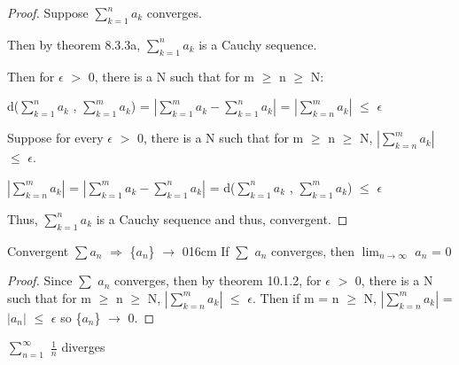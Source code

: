     \begin{proof}
        Suppose $\sum_{k=1}^n a_k$ converges.

        Then by {\color{red} theorem 8.3.3a}, $\sum_{k=1}^n a_k$ is 
        a Cauchy sequence.

        Then for $\epsilon$ $>$ 0, there is a N such that for
        m $\geq$ n $\geq$ N:

        \hspace{1cm}
        d($\sum_{k=1}^n a_k$ , $\sum_{k=1}^m a_k$)
        = $| \sum_{k=1}^m a_k - \sum_{k=1}^n a_k |$
        = $| \sum_{k=n}^m a_k |$ $\leq$ $\epsilon$

        \vspace{0.2cm}

        Suppose for every $\epsilon$ $>$ 0, there is a N
        such that for m $\geq$ n $\geq$ N,
        $| \sum_{k=n}^m a_k |$ $\leq$ $\epsilon$.

        \hspace{1cm}
        $| \sum_{k=n}^m a_k |$
        = $| \sum_{k=1}^m a_k - \sum_{k=1}^n a_k |$
        = d($\sum_{k=1}^n a_k$ , $\sum_{k=1}^m a_k$) $\leq$ $\epsilon$

        Thus, $\sum_{k=1}^n a_k$ is a Cauchy sequence
        and thus, convergent.
    \end{proof}

    \vspace{0.5cm}



    \begin{wtheorem}{Convergent $\sum a_n$
    $\Rightarrow$ \{$a_n$\} $\rightarrow$ 0}{16cm}
        If $\sum$ $a_n$ converges, then
        $\lim_{n \rightarrow \infty}$ $a_n$ = 0
    \end{wtheorem}
    
    \begin{proof}
        Since $\sum$ $a_n$ converges, then by {\color{red} theorem 10.1.2},
        for $\epsilon$ $>$ 0, there is a N such that for m $\geq$ n $\geq$ N,
        $| \sum_{k=n}^m a_k |$ $\leq$ $\epsilon$.
        Then if m = n $\geq$ N, $| \sum_{k=n}^m a_k |$ = $| a_n |$
        $\leq$ $\epsilon$ so \{$a_n$\} $\rightarrow$ 0.
    \end{proof}

    \vspace{0.5cm}



    \begin{example}
        $\sum_{n=1}^{\infty}$ $\frac{1}{n}$ diverges
    \end{example}
    
